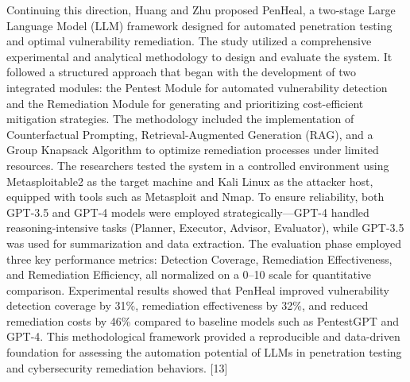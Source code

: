 \documentclass[12pt,a4paper]{report}
\begin{document}
Continuing this direction, Huang and Zhu proposed PenHeal, a two-stage Large Language Model (LLM) framework designed for automated penetration testing and optimal vulnerability remediation. The study utilized a comprehensive experimental and analytical methodology to design and evaluate the system. It followed a structured approach that began with the development of two integrated modules: the Pentest Module for automated vulnerability detection and the Remediation Module for generating and prioritizing cost-efficient mitigation strategies. The methodology included the implementation of Counterfactual Prompting, Retrieval-Augmented Generation (RAG), and a Group Knapsack Algorithm to optimize remediation processes under limited resources. The researchers tested the system in a controlled environment using Metasploitable2 as the target machine and Kali Linux as the attacker host, equipped with tools such as Metasploit and Nmap. To ensure reliability, both GPT-3.5 and GPT-4 models were employed strategically—GPT-4 handled reasoning-intensive tasks (Planner, Executor, Advisor, Evaluator), while GPT-3.5 was used for summarization and data extraction. The evaluation phase employed three key performance metrics: Detection Coverage, Remediation Effectiveness, and Remediation Efficiency, all normalized on a 0–10 scale for quantitative comparison. Experimental results showed that PenHeal improved vulnerability detection coverage by 31\%, remediation effectiveness by 32\%, and reduced remediation costs by 46\% compared to baseline models such as PentestGPT and GPT-4. This methodological framework provided a reproducible and data-driven foundation for assessing the automation potential of LLMs in penetration testing and cybersecurity remediation behaviors. [13]
\end{document}
